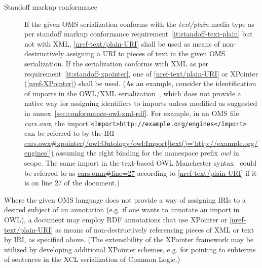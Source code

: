 \documentclass[10pt, a4paper]{isov2}
\makeatletter
\newcommand*{\eg}{e.g.\@\xspace}
\newcommand*{\mimetype}[1]{\textit{#1}}
\renewcommand{\noterefname}{note}
\renewcommand{\nref}[1]{\noterefname~\ref{#1}}
\renewcommand{\nref}[1]{\ref{nref-#1}}
\makeatother
\begin{document}
\begin{description}
\item[Standoff markup conformance] If the given OMS serialization conforms with the \mimetype{text/plain} media type as per standoff markup conformance requirement~\ref{it:standoff-text-plain} but not with XML, \nref{text/plain-URI} shall be used as means of non-destructively assigning a URI to pieces of text in the given OMS serialization.
If the serialization conforms with XML as per requirement~\ref{it:standoff-xpointer}, one of \nref{text/plain-URI} or XPointer (\nref{XPointer}) shall be used. { (As an example, consider the identification of imports in the OWL/XML serialization~\cite{W3C:REC-owl2-xml-serialization-20121211}, which does not provide a native way for assigning identifiers to imports unless modified as suggested in annex~\ref{sec:conformance-owl-xml-rdf}.  For example, in an OMS file \textit{cars.owx}, the import \texttt{<Import>http://example.org/engines</Import>} can be referred to by the IRI \url{cars.owx\#xpointer(/owl:Ontology/owl:Import[text()='http://example.org/engines'])} assuming the right binding for the namespace prefix \textit{owl} in scope.
The same import in the text-based OWL Manchester syntax~\cite{W3C:NOTE-owl2-manchester-syntax-20091027} could be referred to as \url{cars.omn\#line=27} according to \nref{text/plain-URI} if it is on line 27 of the document.)}
\end{description}

Where the given OMS language does not provide a way of assigning IRIs to a desired subject of an annotation (\eg if one wants to annotate an import in OWL), a document may employ RDF annotations that use XPointer or \nref{text/plain-URI} as means of non-destructively referencing pieces of XML or text by IRI, as specified above. (The extensibility of the XPointer framework may be utilized by developing additional XPointer schemes, \eg for pointing to subterms of sentences in the XCL serialization of Common Logic.) 


\end{document}

